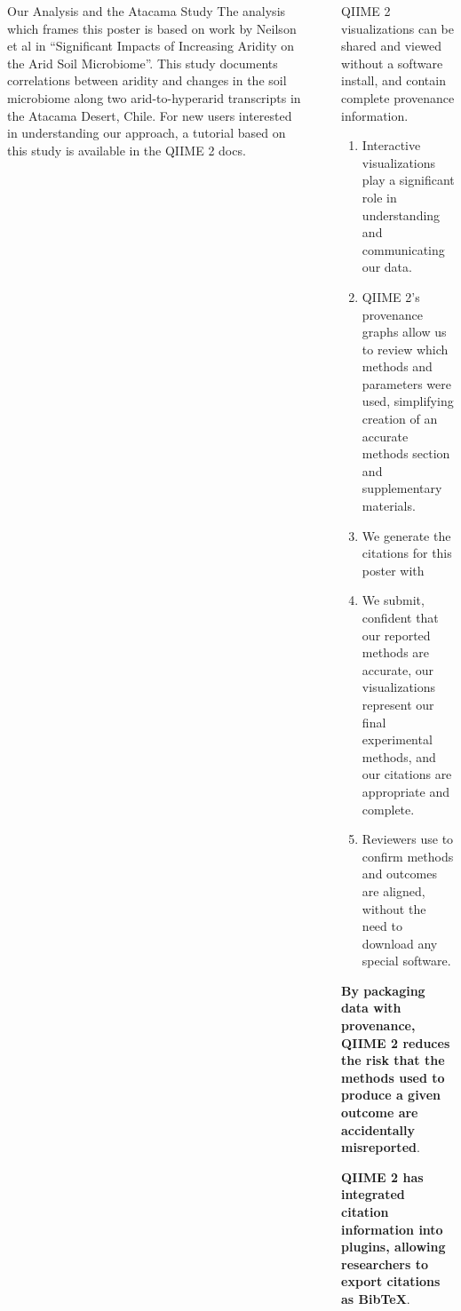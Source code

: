 \documentclass[final]{beamer}
\newlength{\sepwidth}
\newlength{\colwidth}
\newcommand{\separatorcolumn}{\begin{column}{\sepwidth}\end{column}}
\begin{document}
\begin{frame}[t]
\begin{columns}[t]
\begin{column}{\colwidth}
\begin{block}{Our Analysis and the Atacama Study}
    The analysis which frames this poster is based on work by Neilson et al in
    “Significant Impacts of Increasing Aridity on the Arid Soil Microbiome”\cite{Neilsone00195-16}.
    This study documents correlations between aridity and changes in the soil
    microbiome along two arid-to-hyperarid transcripts in the Atacama Desert,
    Chile. For new users interested in understanding our approach, a tutorial
    based on this study is available in the QIIME 2 docs. 

  \end{block}

\end{column}

\separatorcolumn

\begin{column}{\colwidth}

  \begin{block}{QIIME 2 visualizations can be shared and viewed without a software install, and contain complete provenance information.}

    \begin{enumerate}
      \item Interactive visualizations play a significant role in understanding and
      communicating our data. 
      \item QIIME 2’s provenance graphs allow us to review which methods and
      parameters were used, simplifying creation of an accurate methods section
      and supplementary materials.
      \item We generate the citations for this poster with 
      \item We submit, confident that our reported methods are accurate, our
      visualizations represent our final experimental methods, and our
      citations are appropriate and complete.
      \item Reviewers use  to confirm methods and outcomes are
      aligned, without the need to download any special software.
    \end{enumerate}

    \textbf{By packaging data with provenance, QIIME 2 reduces the risk that the
      methods used to produce a given outcome are accidentally misreported}.

    \textbf{QIIME 2 has integrated citation information into plugins, allowing
    researchers to export citations as BibTeX}.


\end{block}
\end{column}
\end{columns}
\end{frame}
\end{document}
